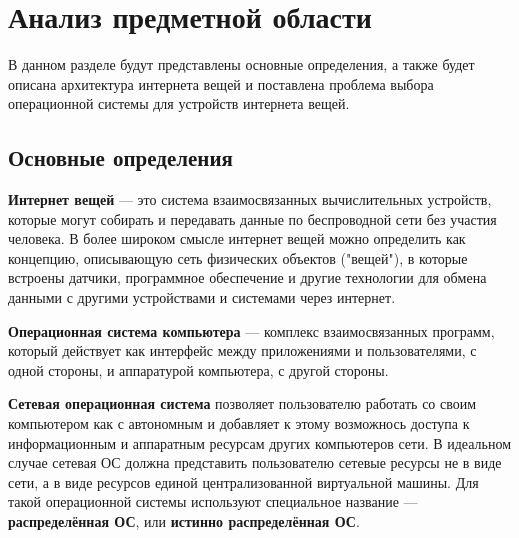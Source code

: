 \chapter{Анализ предметной области}
\label{cha:analysis}
%
%

В данном разделе будут представлены основные определения, а также будет описана архитектура интернета вещей и поставлена проблема выбора операционной системы для устройств интернета вещей.

\section{Основные определения}

\textbf{Интернет вещей} \cite{Kaspersky} --- это система взаимосвязанных вычислительных устройств, которые могут собирать и передавать данные по беспроводной сети без участия человека. В более широком смысле интернет вещей можно определить как концепцию, описывающую сеть физических объектов ("вещей"), в которые встроены датчики, программное обеспечение и другие технологии для обмена данными с другими устройствами и системами через интернет. \cite{Oracle}

\textbf{Операционная система компьютера} \cite{Olifer} --- комплекс взаимосвязанных программ, который действует как интерфейс между приложениями и пользователями, с одной стороны, и аппаратурой компьютера, с другой стороны.

\textbf{Сетевая операционная система} \cite{Olifer} позволяет пользователю работать со своим компьютером как с автономным и добавляет к этому возможнось доступа к информационным и аппаратным ресурсам других компьютеров сети. В идеальном случае сетевая ОС должна представить пользователю сетевые ресурсы не в виде сети, а в виде ресурсов единой централизованной виртуальной машины. Для такой операционной системы используют специальное название --- \textbf{распределённая ОС}, или \textbf{истинно распределённая ОС}.

